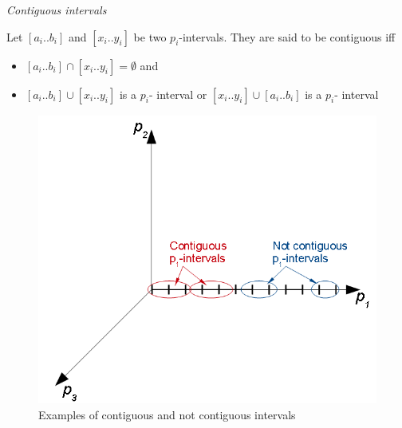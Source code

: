 \begin{defn}
\emph{\label{pers02.def:Contiguous-intervals}Contiguous intervals}

Let $\left[a_{i}..b_{i}\right]$ and $\left[x_{i}..y_{i}\right]$
be two $p_{i}$-intervals. They are said to be contiguous iff
\begin{itemize}
\item $\left[a_{i}..b_{i}\right]\cap\left[x_{i}..y_{i}\right]=\emptyset$
and
\item $\left[a_{i}..b_{i}\right]\cup\left[x_{i}..y_{i}\right]$ is a $p_{i}$-
interval or $\left[x_{i}..y_{i}\right]\cup\left[a_{i}..b_{i}\right]$
is a $p_{i}$- interval
\end{itemize}
\end{defn}
\begin{figure}[h]
\includegraphics[width=0.9\columnwidth]{img/contiguous_intervals_or_not}

\caption{Examples of contiguous and not contiguous intervals}


\end{figure}



